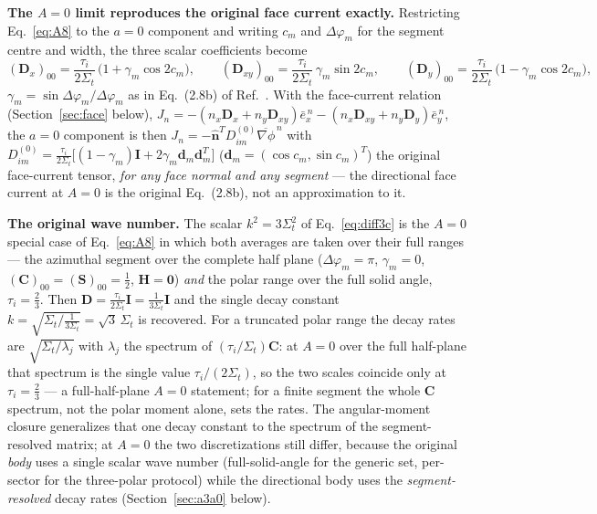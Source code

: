 \documentclass[11pt,a4paper]{article}
\begin{document}
\textbf{The $A{=}0$ limit reproduces the original face current
exactly.} Restricting Eq.~\eqref{eq:A8} to the $a{=}0$ component and
writing $c_m$ and $\Delta\varphi_m$ for the segment centre and width,
the three scalar coefficients become
\begin{equation}
(\mathbf{D}_x)_{00} = \frac{\tau_i}{2\Sigma_t}\,
\bigl(1+\gamma_m\cos 2c_m\bigr),\qquad
(\mathbf{D}_{xy})_{00} = \frac{\tau_i}{2\Sigma_t}\,
\gamma_m\sin 2c_m,\qquad
(\mathbf{D}_y)_{00} = \frac{\tau_i}{2\Sigma_t}\,
\bigl(1-\gamma_m\cos 2c_m\bigr),
\label{eq:CSH-A0}
\end{equation}
$\gamma_m=\sin\Delta\varphi_m/\Delta\varphi_m$ as in
Eq.~(2.8b) of Ref.~\cite{psn2027}. With the face-current relation
(Section~\ref{sec:face} below),
$J_n=-(n_x\mathbf{D}_x+n_y\mathbf{D}_{xy})\bar{e}_x^{\,n}
-(n_x\mathbf{D}_{xy}+n_y\mathbf{D}_y)\bar{e}_y^{\,n}$, the $a{=}0$
component is then $J_n=-\hat{\mathbf{n}}^T D^{(0)}_{im}
\overline{\nabla\phi}^{\,n}$ with
$D^{(0)}_{im}=\frac{\tau_i}{2\Sigma_t}
\bigl[(1-\gamma_m)\mathbf{I}+2\gamma_m\mathbf{d}_m\mathbf{d}_m^T\bigr]$
($\mathbf{d}_m=(\cos c_m,\sin c_m)^T$) the original face-current
tensor, \emph{for any face normal and any segment} --- the directional face current at $A{=}0$ is the original
Eq.~(2.8b), not an approximation to it.

\textbf{The original wave number.} The scalar $k^2=3\Sigma_t^2$ of
Eq.~\eqref{eq:diff3c} is the $A{=}0$ special case of
Eq.~\eqref{eq:A8} in which both averages are taken over their full
ranges --- the azimuthal segment over the complete half plane
($\Delta\varphi_m=\pi$, $\gamma_m=0$, $(\mathbf{C})_{00}=(\mathbf{S})_{00}=\tfrac12$,
$\mathbf{H}=\mathbf{0}$) \emph{and} the polar range over the full
solid angle, $\tau_i=\tfrac23$. Then
$\mathbf{D}=\frac{\tau_i}{2\Sigma_t}\mathbf{I}=\frac{1}{3\Sigma_t}\mathbf{I}$
and the single decay constant
$k=\sqrt{\Sigma_t/\tfrac{1}{3\Sigma_t}}=\sqrt{3}\,\Sigma_t$ is
recovered. For a truncated polar range the decay rates are
$\sqrt{\Sigma_t/\lambda_j}$ with $\lambda_j$ the spectrum of
$(\tau_i/\Sigma_t)\mathbf{C}$: at $A{=}0$ over the full half-plane
that spectrum is the single value $\tau_i/(2\Sigma_t)$, so the two scales
coincide only at $\tau_i=\tfrac23$ --- a full-half-plane $A{=}0$
statement; for a finite segment the whole $\mathbf{C}$ spectrum, not
the polar moment alone, sets the rates. The angular-moment closure
generalizes that one decay constant to the spectrum of the
segment-resolved matrix; at $A{=}0$ the two discretizations still
differ, because the original \emph{body} uses a single scalar wave
number (full-solid-angle for the generic set, per-sector for the
three-polar protocol) while the directional body uses the
\emph{segment-resolved} decay rates (Section~\ref{sec:a3a0} below).
\end{document}
